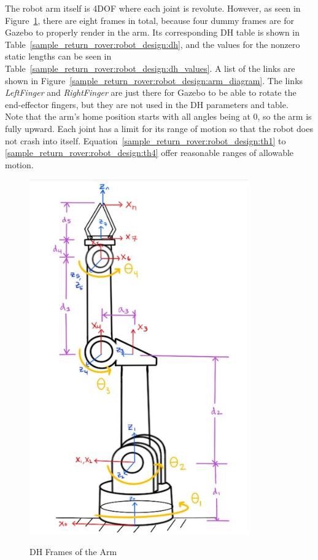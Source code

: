 The robot arm itself is \ac{4DOF} where each joint is revolute. However, as seen in Figure~\ref{sample_return_rover:robot_design:arm_frames}, there are eight frames in total, because four dummy frames are for Gazebo to properly render in the arm. Its corresponding DH table is shown in Table~\ref{sample_return_rover:robot_design:dh}, and the values for the nonzero static lengths can be seen in Table~\ref{sample_return_rover:robot_design:dh_values}. A list of the links are shown in Figure~\ref{sample_return_rover:robot_design:arm_diagram}. The links \textit{LeftFinger} and \textit{RightFinger} are just there for Gazebo to be able to rotate the end-effector fingers, but they are not used in the DH parameters and table. \\

Note that the arm's home position starts with all angles being at 0, so the arm is fully upward. Each joint has a limit for its range of motion so that the robot does not crash into itself. Equation~\ref{sample_return_rover:robot_design:th1} to \ref{sample_return_rover:robot_design:th4} offer reasonable ranges of allowable motion.

\begin{figure}[htbp]
	\centering
	\includegraphics[scale=0.6]{sections/robot-design/images/arm_frames.png}
	\label{sample_return_rover:robot_design:arm_frames}
	\caption{DH Frames of the Arm}
\end{figure}

